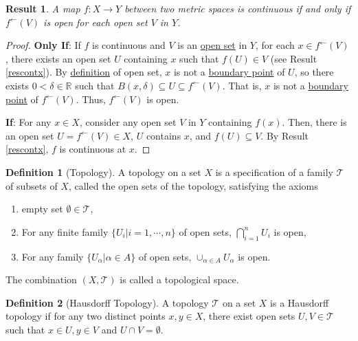 \documentclass[letterpaper,12pt]{article}
\theoremstyle{plain}
\newtheorem{res}{Result}
\theoremstyle{plain}
\theoremstyle{definition}
\newtheorem{defn}{Definition}
\begin{document}
\begin{res}\label{rescontf}
A map $f:X\rightarrow Y$ between two metric spaces is continuous if and only if $f^{\leftarrow}(V)$ is open for each open set $V$ in $Y$.
\end{res}
\begin{proof}
\textbf{Only If}: If $f$ is continuous and $V$ is an \hyperref[defoset]{open set} in $Y$, for each $x\in f^{\leftarrow}(V)$, there exists an open set $U$ containing $x$ such that $f(U)\in V$ (see Result \ref{rescontx}). By \hyperref[defoset]{definition} of open set, $x$ is not a \hyperref[defbpnt]{boundary point} of $U$, so there exists $0<\delta\in \mathbb{R}$ such that $B(x,\delta)\subseteq U \subseteq f^{\leftarrow}(V)$. That is, $x$ is not a \hyperref[defbpnt]{boundary point} of $f^{\leftarrow}(V)$. Thus, $f^{\leftarrow}(V)$ is open.

\noindent \textbf{If}: For any $x\in X$, consider any open set $V$ in $Y$ containing $f(x)$. Then, there is an open set $U=f^{\leftarrow}(V)\in X$, $U$ contains $x$, and $f(U)\subseteq V$. By Result \ref{rescontx}, $f$ is continuous at $x$.
\end{proof}

\begin{defn}[Topology]\label{deftop}
A topology on a set $X$ is a specification of a family $\mathcal{T}$ of subsets of $X$, called the open sets of the topology, satisfying the axioms
\begin{enumerate}
\item empty set $\emptyset\in \mathcal{T}$\index{$\emptyset$},
\item For any finite family $\{U_i|i=1,\cdots,n\}$ of open sets, $\bigcap_{i=1}^{n}U_i$ is open,
\item For any family $\{U_{\alpha}|\alpha\in A\}$ of open sets, $\cup_{\alpha\in A}U_{\alpha}$ is open.
\end{enumerate}
The combination $(X,\mathcal{T})$ is called a topological space.
\end{defn}

\begin{defn}[Hausdorff Topology]\label{defhtop}
A topology $\mathcal{T}$ on a set $X$ is a Hausdorff topology if for any two distinct points $x,y\in X$, there exist open sets $U,V\in \mathcal{T}$ such that $x\in U,y\in V$ and $U\cap V=\emptyset$.
\end{defn}
\end{document}
